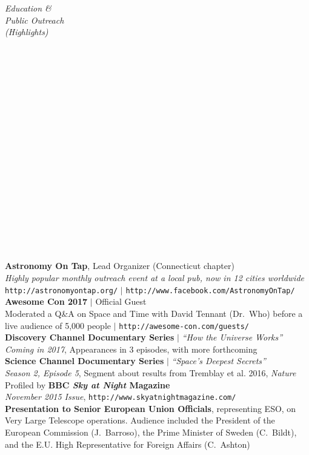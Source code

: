 \documentclass[11pt]{article}
\begin{document}
\vspace{4mm}



\hspace{2.5mm} \parbox{1.5in}{{\it Education \& \\ Public Outreach \\ (Highlights) \\\\\\\\\\\\\\\\\\\\\\\\\\\\\\\\\\\\\\}} \parbox{5.15in}{
{\bf Astronomy On Tap}, Lead Organizer (Connecticut chapter) \\
{\it Highly popular monthly outreach event at a local pub, now in 12 cities worldwide} \\
{\footnotesize \texttt{http://astronomyontap.org/}} $|$ {\footnotesize \texttt{http://www.facebook.com/AstronomyOnTap/}} \\


\textbf{Awesome Con 2017} $|$ Official Guest \\
Moderated a Q\&A on Space and Time with David Tennant (Dr.~Who) before a live audience of 5,000 people $|$ \texttt{http://awesome-con.com/guests/}  \\

\textbf{Discovery Channel Documentary Series} $|$ {\it ``How the Universe Works''} \\ {\it Coming in 2017}, Appearances in 3 episodes, with more forthcoming\\

\textbf{Science Channel Documentary Series} $|$ {\it ``Space's Deepest Secrets''} \\ {\it Season 2, Episode 5}, 
Segment about results from Tremblay et al. 2016, {\it Nature}\\

Profiled by \textbf{BBC \textit{Sky at Night} Magazine} \\ {\it November 2015 Issue}, 
{\footnotesize \texttt{http://www.skyatnightmagazine.com/}}\\

{\bf Presentation to Senior European Union Officials}, representing ESO, on Very Large Telescope operations. Audience included 
the President of the European Commission (J.~Barroso), the Prime Minister of Sweden (C.~Bildt), and the 
E.U. High Representative for Foreign Affairs (C.~Ashton) \\ }
\end{document}
